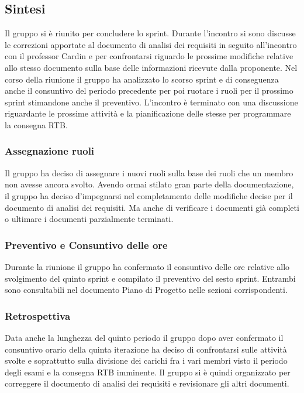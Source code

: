 \documentclass[10pt]{article}
\begin{document}
\subsection{Sintesi}
Il gruppo si è riunito per concludere lo sprint. Durante l'incontro si sono discusse le correzioni apportate al documento di analisi
dei requisiti in seguito all'incontro con il professor Cardin e per confrontarsi riguardo le prossime modifiche relative allo stesso
documento sulla base delle informazioni ricevute dalla proponente.
Nel corso della riunione il gruppo ha analizzato lo scorso sprint e di conseguenza anche il consuntivo
del periodo precedente per poi ruotare i ruoli per il prossimo sprint stimandone anche il preventivo.
L'incontro è terminato con una discussione riguardante le prossime attività e la pianificazione delle stesse
per programmare la consegna RTB.

\subsubsection{Assegnazione ruoli}
Il gruppo ha deciso di assegnare i nuovi ruoli sulla base dei ruoli che un membro non avesse ancora svolto.
Avendo ormai stilato gran parte della documentazione, il gruppo ha deciso d'impegnarsi nel completamento delle modifiche decise
per il documento di analisi dei requisiti. Ma anche di verificare i documenti già completi o ultimare i documenti parzialmente terminati.

\subsubsection{Preventivo e Consuntivo delle ore}
Durante la riunione il gruppo ha confermato il consuntivo delle ore relative allo svolgimento del quinto sprint e compilato il preventivo del sesto sprint.
Entrambi sono consultabili nel documento Piano di Progetto nelle sezioni corrispondenti.

\subsubsection{Retrospettiva}
Data anche la lunghezza del quinto periodo il gruppo dopo aver confermato il consuntivo orario della quinta iterazione ha deciso di confrontarsi sulle
attività svolte e soprattutto sulla divisione dei carichi fra i vari membri visto il periodo degli esami e la consegna RTB imminente.
Il gruppo si è quindi organizzato per correggere il documento di analisi dei requisiti e revisionare gli altri documenti.
\end{document}
